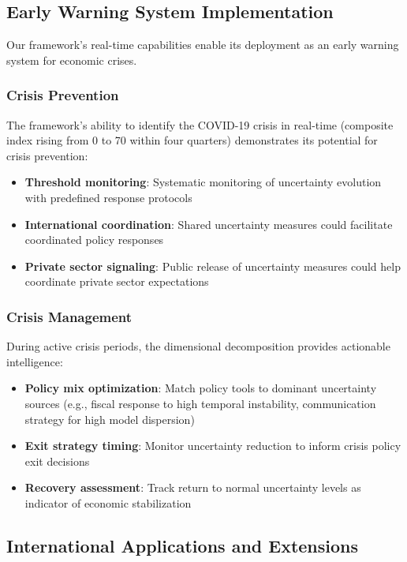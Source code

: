 \documentclass[5p,authoryear]{elsarticle}
\begin{document}
\subsection{Early Warning System Implementation}

Our framework's real-time capabilities enable its deployment as an early warning system for economic crises.

\subsubsection{Crisis Prevention}
The framework's ability to identify the COVID-19 crisis in real-time (composite index rising from 0 to 70 within four quarters) demonstrates its potential for crisis prevention:

\begin{itemize}
    \item \textbf{Threshold monitoring}: Systematic monitoring of uncertainty evolution with predefined response protocols
    \item \textbf{International coordination}: Shared uncertainty measures could facilitate coordinated policy responses
    \item \textbf{Private sector signaling}: Public release of uncertainty measures could help coordinate private sector expectations
\end{itemize}

\subsubsection{Crisis Management}
During active crisis periods, the dimensional decomposition provides actionable intelligence:

\begin{itemize}
    \item \textbf{Policy mix optimization}: Match policy tools to dominant uncertainty sources (e.g., fiscal response to high temporal instability, communication strategy for high model dispersion)
    \item \textbf{Exit strategy timing}: Monitor uncertainty reduction to inform crisis policy exit decisions
    \item \textbf{Recovery assessment}: Track return to normal uncertainty levels as indicator of economic stabilization
\end{itemize}

\subsection{International Applications and Extensions}
\end{document}
